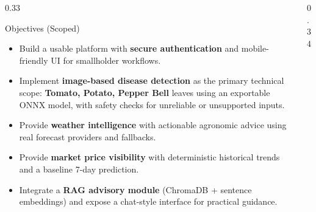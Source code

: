 \documentclass[final]{beamer}
\begin{document}
\begin{frame}[t]
\begin{columns}[t,totalwidth=\linewidth]
\begin{column}{0.33\linewidth}
\begin{block}{Objectives (Scoped)}
\begin{itemize}
  \item Build a usable platform with \textbf{secure authentication} and mobile-friendly UI for smallholder workflows.
  \item Implement \textbf{image-based disease detection} as the primary technical scope: \textbf{Tomato, Potato, Pepper Bell} leaves using an exportable ONNX model, with safety checks for unreliable or unsupported inputs.
  \item Provide \textbf{weather intelligence} with actionable agronomic advice using real forecast providers and fallbacks.
  \item Provide \textbf{market price visibility} with deterministic historical trends and a baseline 7-day prediction.
  \item Integrate a \textbf{RAG advisory module} (ChromaDB + sentence embeddings) and expose a chat-style interface for practical guidance.
\end{itemize}
\end{block}

\end{column}

\begin{column}{0.34\linewidth}


\end{column}
\end{columns}
\end{frame}
\end{document}
